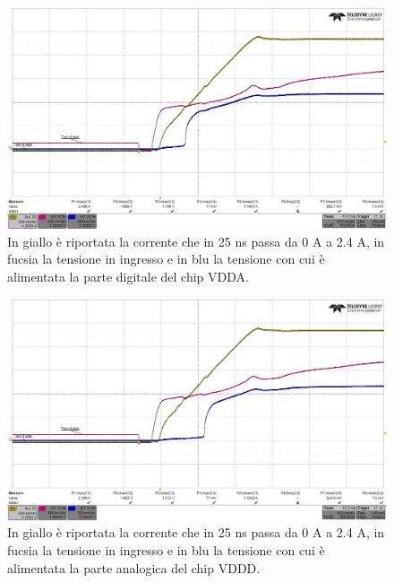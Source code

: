 \begin{figure}
\centering
\includegraphics[scale=.3]{Immagini/rd-powup-dir6}
\caption{In giallo è riportata la corrente che in 25 ns passa da 0 A a 2.4 A, in fucsia la tensione in ingresso e in blu la tensione con cui è alimentata la parte digitale del chip VDDA.}
\label{rd-powup-dir6}
\end{figure}

\begin{figure}
\centering
\includegraphics[scale=.3]{Immagini/rd-powup-dir7}
\caption{In giallo è riportata la corrente che in 25 ns passa da 0 A a 2.4 A, in fucsia la tensione in ingresso e in blu la tensione con cui è alimentata la parte analogica del chip VDDD.}
\label{rd-powup-dir7}
\end{figure}


